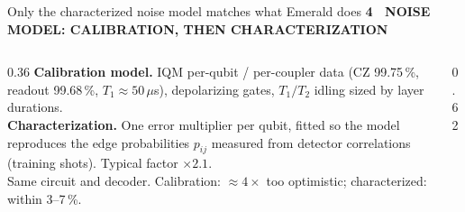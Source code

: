 \documentclass[aspectratio=169,11pt]{beamer}
\newcommand{\eyebrow}[1]{{\color{accent}\scriptsize\bfseries\MakeUppercase{#1}}\par\smallskip}
\begin{document}
\begin{frame}{Only the characterized noise model matches what Emerald does}
\eyebrow{4 \textperiodcentered\ Noise model: calibration, then characterization}
\begin{columns}[T]
\begin{column}{0.36\textwidth}\footnotesize
\textbf{Calibration model.} IQM per-qubit / per-coupler data (CZ 99.75\,\%, readout 99.68\,\%, $T_1\approx50\,\mu$s), depolarizing gates, $T_1/T_2$ idling sized by layer durations.\\[6pt]
\textbf{Characterization.} One error multiplier per qubit, fitted so the model reproduces the edge probabilities $p_{ij}$ measured from detector correlations (training shots). Typical factor $\times 2.1$.\\[6pt]
{\color{soft}\scriptsize Same circuit and decoder. Calibration: $\approx 4\times$ too optimistic; characterized: within 3--7\,\%.}
\end{column}
\begin{column}{0.62\textwidth}
\end{column}
\end{columns}
\end{frame}
\end{document}

